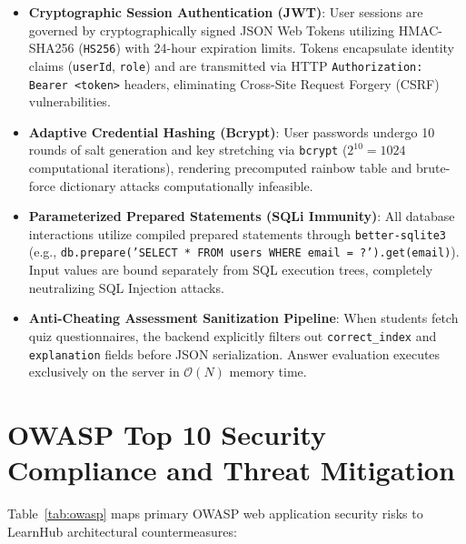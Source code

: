 \documentclass[12pt,a4paper]{report}
\begin{document}
\begin{itemize}[itemsep=5pt]
    \item \textbf{Cryptographic Session Authentication (JWT)}: User sessions are governed by cryptographically signed JSON Web Tokens utilizing HMAC-SHA256 (\texttt{HS256}) with 24-hour expiration limits. Tokens encapsulate identity claims (\texttt{userId}, \texttt{role}) and are transmitted via HTTP \texttt{Authorization: Bearer <token>} headers, eliminating Cross-Site Request Forgery (CSRF) vulnerabilities.
    \item \textbf{Adaptive Credential Hashing (Bcrypt)}: User passwords undergo 10 rounds of salt generation and key stretching via \texttt{bcrypt} ($2^{10} = 1024$ computational iterations), rendering precomputed rainbow table and brute-force dictionary attacks computationally infeasible.
    \item \textbf{Parameterized Prepared Statements (SQLi Immunity)}: All database interactions utilize compiled prepared statements through \texttt{better-sqlite3} (e.g., \texttt{db.prepare('SELECT * FROM users WHERE email = ?').get(email)}). Input values are bound separately from SQL execution trees, completely neutralizing SQL Injection attacks.
    \item \textbf{Anti-Cheating Assessment Sanitization Pipeline}: When students fetch quiz questionnaires, the backend explicitly filters out \texttt{correct\_index} and \texttt{explanation} fields before JSON serialization. Answer evaluation executes exclusively on the server in $\mathcal{O}(N)$ memory time.
\end{itemize}

\section{OWASP Top 10 Security Compliance and Threat Mitigation}
Table~\ref{tab:owasp} maps primary OWASP web application security risks to LearnHub architectural countermeasures:
\end{document}
